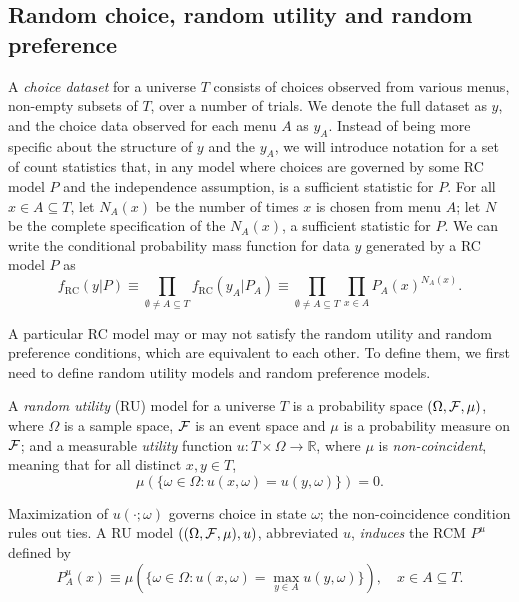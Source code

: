 \documentclass[11pt,letter]{article}
\begin{document}
\subsection{Random choice, random utility and random preference}

A {\em choice dataset} for a universe $T$ consists of choices observed from various menus, non-empty subsets of $T$, over a number of trials.
We denote the full dataset as $y$, and the choice data observed for each menu $A$ as $y_A$.
Instead of being more specific about the structure of $y$ and the $y_A$, we will introduce notation for a set of count statistics that, in any model where choices are governed by some RC model $P$ and the independence assumption, is a sufficient statistic for $P$.
For all $x \in A \subseteq T$, let $N_A(x)$ be the number of times $x$ is chosen from menu $A$; let $N$ be the complete specification of the $N_A(x)$, a sufficient statistic for $P$.
We can write the conditional probability mass function for data $y$ generated by a RC model $P$ as
\begin{equation}\label{e:likeP}
  f_\mathrm{RC}(y|P) \equiv \prod_{\emptyset \neq A \subseteq T} f_\mathrm{RC}(y_A|P_A) \equiv \prod_{\emptyset \neq A \subseteq T} \prod_{x \in A} P_A(x)^{N_A(x)}.
\end{equation}

A particular RC model may or may not satisfy the random utility and random preference conditions, which are equivalent to each other.
To define them, we first need to define random utility models and random preference models.

\begin{defn}
    A {\em random utility} (RU) model for a universe $T$ is a probability space $(\Omega,{\cal F},\mu)$, where $\Omega$ is a sample space, ${\cal F}$ is an event space and $\mu$ is a probability measure on ${\cal F}$; and a measurable {\em utility} function $u\colon T \times \Omega \rightarrow \mathbb{R}$, where $\mu$ is {\em non-coincident}, meaning that for all distinct $x,y \in T$,
\[
    \mu\left(\{\omega \in \Omega \colon u(x,\omega) = u(y,\omega)\}\right)
    = 0.
\]
\end{defn}

Maximization of $u(\cdot;\omega)$ governs choice in state $\omega$; the non-coincidence condition rules out ties.
A RU model $((\Omega,{\cal F},\mu), u)$, abbreviated $u$, {\em induces} the RCM $P^u$ defined by
\[
    P^u_A(x) \equiv \mu\left(
        \{\omega \in \Omega \colon u(x,\omega) = \max_{y\in A}u(y,\omega)\}
    \right),
    \quad x \in A \subseteq T.
\]
\end{document}
